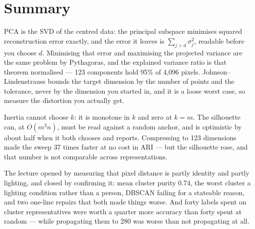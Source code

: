 \documentclass[11pt,a4paper]{article}
\begin{document}
\section*{Summary}

PCA is the SVD of the centred data: the principal subspace minimises squared
reconstruction error exactly, and the error it leaves is
$\sum_{j>d}\sigma_j^2$, readable before you choose $d$. Minimising that error
and maximising the projected variance are the same problem by Pythagoras, and
the explained variance ratio is that theorem normalised --- 123 components hold
95\% of 4{,}096 pixels. Johnson--Lindenstrauss bounds the target dimension by
the number of points and the tolerance, never by the dimension you started in,
and it is a loose worst case, so measure the distortion you actually get.

Inertia cannot choose $k$: it is monotone in $k$ and zero at $k = m$. The
silhouette can, at $O(m^2n)$, must be read against a random anchor, and is
optimistic by about half when it both chooses and reports. Compressing to 123
dimensions made the sweep 37 times faster at no cost in ARI --- but the
silhouette rose, and that number is not comparable across representations.

The lecture opened by measuring that pixel distance is partly identity and
partly lighting, and closed by confirming it: mean cluster purity 0.74, the
worst cluster a lighting condition rather than a person, DBSCAN failing for a
stateable reason, and two one-line repairs that both made things worse. And
forty labels spent on cluster representatives were worth a quarter more
accuracy than forty spent at random --- while propagating them to 280 was worse
than not propagating at all.
\end{document}
